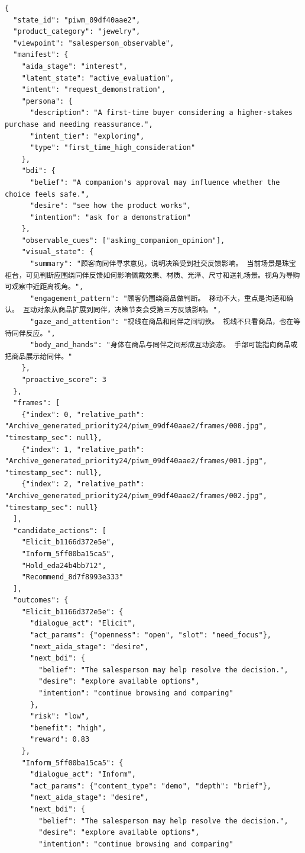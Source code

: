 \begin{verbatim}
{
  "state_id": "piwm_09df40aae2",
  "product_category": "jewelry",
  "viewpoint": "salesperson_observable",
  "manifest": {
    "aida_stage": "interest",
    "latent_state": "active_evaluation",
    "intent": "request_demonstration",
    "persona": {
      "description": "A first-time buyer considering a higher-stakes purchase and needing reassurance.",
      "intent_tier": "exploring",
      "type": "first_time_high_consideration"
    },
    "bdi": {
      "belief": "A companion's approval may influence whether the choice feels safe.",
      "desire": "see how the product works",
      "intention": "ask for a demonstration"
    },
    "observable_cues": ["asking_companion_opinion"],
    "visual_state": {
      "summary": "顾客向同伴寻求意见，说明决策受到社交反馈影响。 当前场景是珠宝柜台，可见判断应围绕同伴反馈如何影响佩戴效果、材质、光泽、尺寸和送礼场景。视角为导购可观察中近距离视角。",
      "engagement_pattern": "顾客仍围绕商品做判断。 移动不大，重点是沟通和确认。 互动对象从商品扩展到同伴，决策节奏会受第三方反馈影响。",
      "gaze_and_attention": "视线在商品和同伴之间切换。 视线不只看商品，也在等待同伴反应。",
      "body_and_hands": "身体在商品与同伴之间形成互动姿态。 手部可能指向商品或把商品展示给同伴。"
    },
    "proactive_score": 3
  },
  "frames": [
    {"index": 0, "relative_path": "Archive_generated_priority24/piwm_09df40aae2/frames/000.jpg", "timestamp_sec": null},
    {"index": 1, "relative_path": "Archive_generated_priority24/piwm_09df40aae2/frames/001.jpg", "timestamp_sec": null},
    {"index": 2, "relative_path": "Archive_generated_priority24/piwm_09df40aae2/frames/002.jpg", "timestamp_sec": null}
  ],
  "candidate_actions": [
    "Elicit_b1166d372e5e",
    "Inform_5ff00ba15ca5",
    "Hold_eda24b4bb712",
    "Recommend_8d7f8993e333"
  ],
  "outcomes": {
    "Elicit_b1166d372e5e": {
      "dialogue_act": "Elicit",
      "act_params": {"openness": "open", "slot": "need_focus"},
      "next_aida_stage": "desire",
      "next_bdi": {
        "belief": "The salesperson may help resolve the decision.",
        "desire": "explore available options",
        "intention": "continue browsing and comparing"
      },
      "risk": "low",
      "benefit": "high",
      "reward": 0.83
    },
    "Inform_5ff00ba15ca5": {
      "dialogue_act": "Inform",
      "act_params": {"content_type": "demo", "depth": "brief"},
      "next_aida_stage": "desire",
      "next_bdi": {
        "belief": "The salesperson may help resolve the decision.",
        "desire": "explore available options",
        "intention": "continue browsing and comparing"

\end{verbatim}
